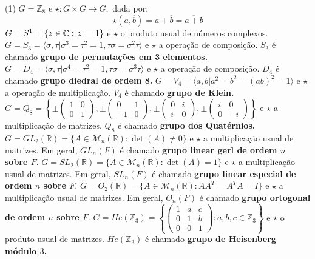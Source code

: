 \documentclass[12pt, a4paper]{article}
\newcommand{\negrito}[1]{\mbox{\boldmath{$#1$}}}
\begin{document}
\begin{tasks}[counter-format={(tsk[a])},label-width=3.6ex, label-format = {\bfseries}, column-sep = {0pt}](1)
\task[\textcolor{Floresta}{$\negrito{(a)} $}] $G = \mathbb{Z}_8$ e $\star \colon G \times G \to G,$ dada por:
\[
\star(\overline{a}, \overline{b}) = \overline{a} + \overline{b} = \overline{a+b}
\]
\task[\textcolor{Floresta}{$\negrito{(b)} $}] $G = S^{1} = \{ z \in \mathbb{C} : \abs{z} = 1 \}$ e $\star$ o produto usual de números complexos.
\task[\textcolor{Floresta}{$\negrito{(c)} $}] $G = S_3 =\langle \sigma, \tau | \sigma^3 = \tau^2 = 1, \tau \sigma = \sigma^2 \tau \rangle$ e $\star$ a operação de composição. $S_3$ é chamado \textbf{grupo de permutações em 3 elementos.}
\task[\textcolor{Floresta}{$\negrito{(d)} $}] $G = D_4 =\langle \sigma, \tau | \sigma^4 = \tau^2 = 1, \tau \sigma = \sigma^3 \tau \rangle$ e $\star$ a operação de composição. $D_4$ é chamado \textbf{grupo diedral de ordem 8.}
\task[\textcolor{Floresta}{$\negrito{(e)} $}] $G = V_4 = \langle a,b | a^2 = b^2 = (ab)^2 = 1 \rangle$ e $\star$ a operação de multiplicação. $V_4$ é chamado \textbf{grupo de Klein.}
\task[\textcolor{Floresta}{$\negrito{(f)} $}] $G = Q_8 = \left\{ \pm \left( \begin{array}{cc} 1 & 0 \\ 0 & 1 \end{array} \right), \pm \left( \begin{array}{cc} 0 & 1 \\ -1 & 0 \end{array}\right), \pm \left( \begin{array}{cc} 0 & i \\ i & 0 \end{array}\right), \pm \left( \begin{array}{cc} i & 0 \\ 0 & -i \end{array}\right) \right\}$ e $\star$ a multiplicação de matrizes. $Q_8$ é chamado \textbf{grupo dos Quatérnios.}
\task[\textcolor{Floresta}{$\negrito{(g)} $}] $G = GL_2(\mathbb{R}) = \{ A \in \mathcal{M}_n(\mathbb{R}) : \det(A) \neq 0 \}$ e $\star$ a multiplicação usual de matrizes. Em geral, $GL_n(F)$ é chamado \textbf{grupo linear gerl de ordem $n$ sobre $F.$}
\task[\textcolor{Floresta}{$\negrito{(h)} $}] $G = SL_2(\mathbb{R}) = \{ A \in \mathcal{M}_n(\mathbb{R}) : \det(A)= 1 \}$ e $\star$ a multiplicação usual de matrizes. Em geral, $SL_n(F)$ é chamado \textbf{grupo linear especial de ordem $n$ sobre $F.$}
\task[\textcolor{Floresta}{$\negrito{(i)} $}] $G = O_2(\mathbb{R}) = \{ A \in \mathcal{M}_n(\mathbb{R}) : AA^T = A^TA = I \}$ e $\star$ a multiplicação usual de matrizes. Em geral, $O_n(F)$ é chamado \textbf{grupo ortogonal de ordem $n$ sobre $F.$}
\task[\textcolor{Floresta}{$\negrito{(j)} $}] $G = He(\mathbb{Z}_3) = \left\{ \left( \begin{array}{ccc} 1 & a & c \\ 0 & 1 & b \\ 0 & 0 & 1 \end{array} \right) : a,b,c \in \mathbb{Z}_3 \right\}$ e $\star$ o produto usual de matrizes. $ He(\mathbb{Z}_3)$ é chamado \textbf{grupo de Heisenberg módulo $3$.}
\end{tasks}
\end{document}
